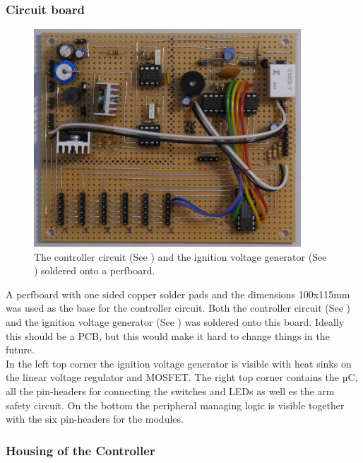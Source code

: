 \pagebreak

\subsubsection{Circuit board}
\label{Circuitboard}

\begin{figure}[!ht]
    \centering
    \includegraphics[width=10cm]{./Figures/controller_circuit_soldered.JPG}
    \caption{The controller circuit (See ) and the ignition voltage generator (See ) soldered onto a perfboard.   }
    \label{fig:controller_circuit_soldered}     
\end{figure}

\noindent A perfboard with one sided copper solder pads and the dimensions 100x115mm was used as the base for the controller circuit. Both the controller circuit (See ) and the ignition voltage generator (See ) was soldered onto this board. Ideally this should be a PCB, but this would make it hard to change things in the future. \\

\noindent In the left top corner the ignition voltage generator is visible with heat sinks on the linear voltage regulator and MOSFET. The right top corner contains the µC, all the pin-headers for connecting the switches and LEDs as well es the arm safety circuit. On the bottom the peripheral managing logic is visible together with the six pin-headers for the modules.

\pagebreak

\subsubsection{Housing of the Controller}
\label{Housing of the Controller}

